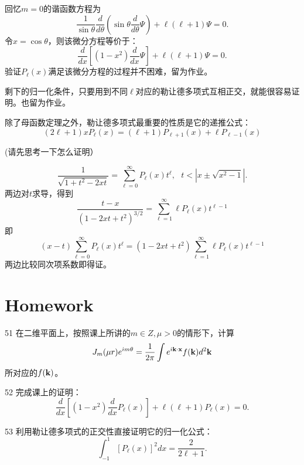 \documentclass[CJK]{beamer}
\begin{document}
\begin{frame}
\bch
回忆$m=0$的谐函数方程为
$$ \frac{1}{\sin\theta}\frac{d}{d\theta}\left(\sin\theta \frac{d}{d\theta}\Psi\right) + \ell(\ell+1) \Psi= 0.$$
令$x = \cos\theta$，则该微分方程等价于：
$$ \frac{d}{dx}\left[(1-x^2)\frac{d}{dx} \Psi\right]+\ell(\ell+1)\Psi=0 .$$
验证$P_\ell(x)$满足该微分方程的过程并不困难，留为作业\bye。

\skipline

剩下的归一化条件，只要用到不同$\ell$对应的勒让德多项式互相正交，就能很容易证明。也留为作业\bye。
\ech
\end{frame}

\begin{frame}
\bch
除了母函数定理之外，勒让德多项式最重要的性质是它的递推公式：
\tbox
    {$$ (2\ell+1)xP_\ell(x) = (\ell+1)P_{\ell+1}(x)+\ell P_{\ell-1}(x)$$ }

    (请先思考一下怎么证明）
\ech
\end{frame}

\begin{frame}
\bch
  $$ \frac{1}{\sqrt{1+t^2-2xt}} = \sum_{\ell =0}^\infty P_\ell (x) t^\ell,\ \ \ t<|x\pm \sqrt{x^2-1}|  .$$
两边对$t$求导，得到
$$ \frac{t-x}{(1-2xt+t^2)^{3/2}} =  \sum_{\ell = 1}^\infty \ell P_\ell(x)t^{\ell-1}$$
即
$$(x-t)\sum_{\ell=0}^\infty P_\ell(x)t^\ell  = (1-2xt+t^2)\sum_{\ell=1}^\infty \ell P_\ell(x)t^{\ell-1}$$
两边比较同次项系数即得证。
\ech
\end{frame}

\section{Homework}

\begin{frame}
\bch
\bitem
\item[51]{在二维平面上，按照课上所讲的$m\in Z, \mu>0$的情形下，计算
  $$J_m(\mu r)e^{{\dot{\imath}} m\theta} = \frac{1}{2\pi} \int e^{{\dot{\imath}} {\mathbf{k}} \cdot{\mathbf{x}}}f({\mathbf{k}}) d^2{\mathbf{k}} $$
  所对应的$f({\mathbf{k}})$。
}
\item[52]{完成课上的证明：
  $$ \frac{d}{dx}\left[(1-x^2)\frac{d}{dx} P_{\ell}(x)\right]+\ell(\ell+1) P_\ell(x)=0 .$$}
\item[53]{利用勒让德多项式的正交性直接证明它的归一化公式：
  $$ \int_{-1}^1 \left[P_\ell(x)\right]^2 dx = \frac{2}{2\ell+1}.$$
  }
  \eitem
\ech
\end{frame}
\end{document}
